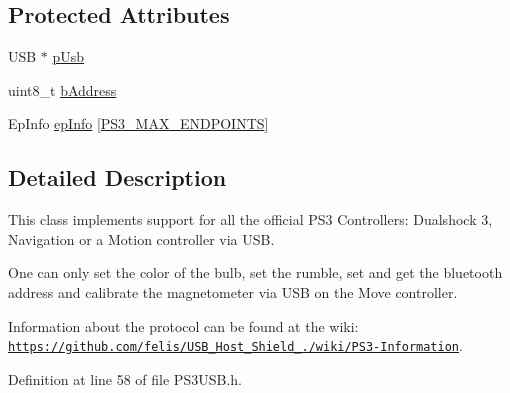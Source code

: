 \subsection*{\-Protected \-Attributes}
\begin{DoxyCompactItemize}
\item 
\-U\-S\-B $\ast$ \hyperlink{class_p_s3_u_s_b_aa1873f41ae0da7c4568cfb7517560c48}{p\-Usb}
\item 
uint8\-\_\-t \hyperlink{class_p_s3_u_s_b_a3f43df159277003acdf7dd107bda27fd}{b\-Address}
\item 
\-Ep\-Info \hyperlink{class_p_s3_u_s_b_a394dbb0a59b587210e5958f08dac48f1}{ep\-Info} \mbox{[}\hyperlink{_p_s3_u_s_b_8h_a168ab47b14a95d7cf8066d553a9cb862}{\-P\-S3\-\_\-\-M\-A\-X\-\_\-\-E\-N\-D\-P\-O\-I\-N\-T\-S}\mbox{]}
\end{DoxyCompactItemize}


\subsection{\-Detailed \-Description}
\-This class implements support for all the official \-P\-S3 \-Controllers\-: \-Dualshock 3, \-Navigation or a \-Motion controller via \-U\-S\-B.

\-One can only set the color of the bulb, set the rumble, set and get the bluetooth address and calibrate the magnetometer via \-U\-S\-B on the \-Move controller.

\-Information about the protocol can be found at the wiki\-: \href{https://github.com/felis/USB_Host_Shield_2.0/wiki/PS3-Information}{\tt https\-://github.\-com/felis/\-U\-S\-B\-\_\-\-Host\-\_\-\-Shield\-\_./wiki/\-P\-S3-\/\-Information}. 

\-Definition at line 58 of file \-P\-S3\-U\-S\-B.\-h.



